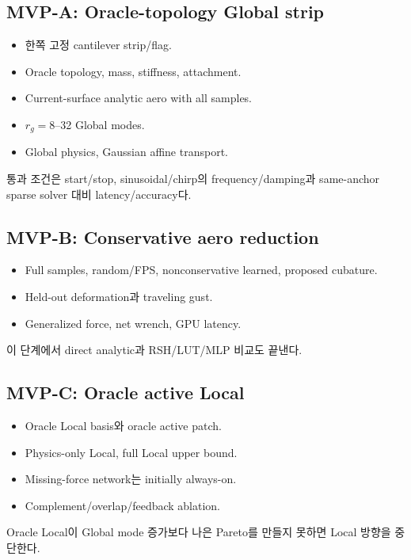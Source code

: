 \documentclass[11pt,a4paper]{article}
\begin{document}
\subsection{MVP-A: Oracle-topology Global strip}

\begin{itemize}[leftmargin=1.5em]
  \item 한쪽 고정 cantilever strip/flag.
  \item Oracle topology, mass, stiffness, attachment.
  \item Current-surface analytic aero with all samples.
  \item \(r_g=8\)--32 Global modes.
  \item Global physics, Gaussian affine transport.
\end{itemize}

통과 조건은 start/stop, sinusoidal/chirp의 frequency/damping과
same-anchor sparse solver 대비 latency/accuracy다.

\subsection{MVP-B: Conservative aero reduction}

\begin{itemize}[leftmargin=1.5em]
  \item Full samples, random/FPS, nonconservative learned, proposed cubature.
  \item Held-out deformation과 traveling gust.
  \item Generalized force, net wrench, GPU latency.
\end{itemize}

이 단계에서 direct analytic과 RSH/LUT/MLP 비교도 끝낸다.

\subsection{MVP-C: Oracle active Local}

\begin{itemize}[leftmargin=1.5em]
  \item Oracle Local basis와 oracle active patch.
  \item Physics-only Local, full Local upper bound.
  \item Missing-force network는 initially always-on.
  \item Complement/overlap/feedback ablation.
\end{itemize}

Oracle Local이 Global mode 증가보다 나은 Pareto를 만들지 못하면 Local 방향을 중단한다.
\end{document}

